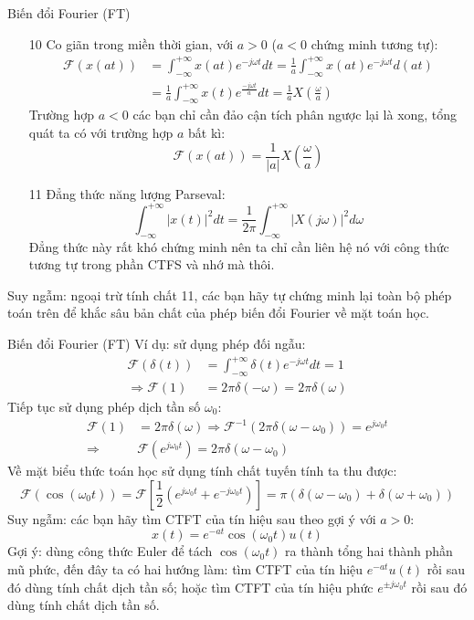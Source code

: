 \documentclass[8pt]{beamer}
\begin{document}
\begin{frame}{Biến đổi Fourier (FT)}
\begin{enumerate}
	\item[10] Co giãn trong miền thời gian, với $a>0$ ($a<0$ chứng minh tương tự):
\begin{equation*}
\begin{split}
	\mathscr{F}(x(at))&=\int_{-\infty}^{+\infty}x(at)e^{-j\omega t}dt=\frac{1}{a}\int_{-\infty}^{+\infty}x(at)e^{-j\omega t}d(at)\\
			  &=\frac{1}{a}\int_{-\infty}^{+\infty}x(t)e^{\frac{-j\omega t}{a}}dt=\frac{1}{a}X\left(\frac{\omega}{a}\right)
\end{split}
\end{equation*}
Trường hợp $a<0$ các bạn chỉ cần đảo cận tích phân ngược lại là xong, tổng quát ta có với trường hợp $a$ bất kì:
$$\mathscr{F}\left(x(at)\right)=\frac{1}{|a|}X\left(\frac{\omega}{a}\right)$$
\item[11] Đẳng thức năng lượng Parseval:
	$$\int_{-\infty}^{+\infty}|x(t)|^2 dt=\frac{1}{2\pi}\int_{-\infty}^{+\infty}|X(j\omega)|^2d\omega$$
	Đẳng thức này rất khó chứng minh nên ta chỉ cần liên hệ nó với công thức tương tự trong phần CTFS và nhớ mà thôi.
\end{enumerate}
Suy ngẫm: ngoại trừ tính chất 11, các bạn hãy tự chứng minh lại \alert{toàn bộ} phép toán trên để khắc sâu bản chất của phép biến đổi Fourier về mặt toán học.
\end{frame}
\begin{frame}{Biến đổi Fourier (FT)}
Ví dụ: sử dụng phép đối ngẫu:
\begin{equation*}
\begin{split}
	\mathscr{F}(\delta(t))&=\int_{-\infty}^{+\infty}\delta(t)e^{-j\omega t}dt=1 \\
	\Rightarrow \mathscr{F}(1)&=2\pi\delta(-\omega)=2\pi\delta(\omega)
\end{split}
\end{equation*}
Tiếp tục sử dụng phép dịch tần số $\omega_{0}$:
\begin{equation*}
	\begin{split}
		\mathscr{F}(1)&=2\pi\delta(\omega)\Rightarrow \mathscr{F}^{-1}(2\pi\delta(\omega-\omega_{0}))=e^{j\omega_{0}t}\\
		\Rightarrow & \mathscr{F}(e^{j\omega_{0}t})=2\pi\delta(\omega-\omega_{0})
	\end{split}
\end{equation*}
Về mặt \alert{biểu thức toán học} sử dụng tính chất tuyến tính ta thu được:
$$\mathscr{F}(\cos{(\omega_{0}t)})=\mathscr{F}\left[\frac{1}{2}\left(e^{j\omega_{0}t}+e^{-j\omega_{0}t}\right)\right]=\pi(\delta(\omega-\omega_{0})+\delta(\omega+\omega_{0}))$$
Suy ngẫm: các bạn hãy tìm CTFT của tín hiệu sau theo gợi ý với $a>0$:
$$x(t)=e^{-at}\cos{(\omega_{0}t)}u(t)$$
Gợi ý: dùng công thức Euler để tách $\cos(\omega_{0}t)$ ra thành tổng hai thành phần mũ phức, đến đây ta có hai hướng làm: tìm CTFT của tín hiệu $e^{-at}u(t)$ rồi sau đó dùng tính chất dịch tần số; hoặc tìm CTFT của tín hiệu phức $e^{\pm j\omega_{0}t}$ rồi sau đó dùng tính chất dịch tần số.
\end{frame}
\end{document}
